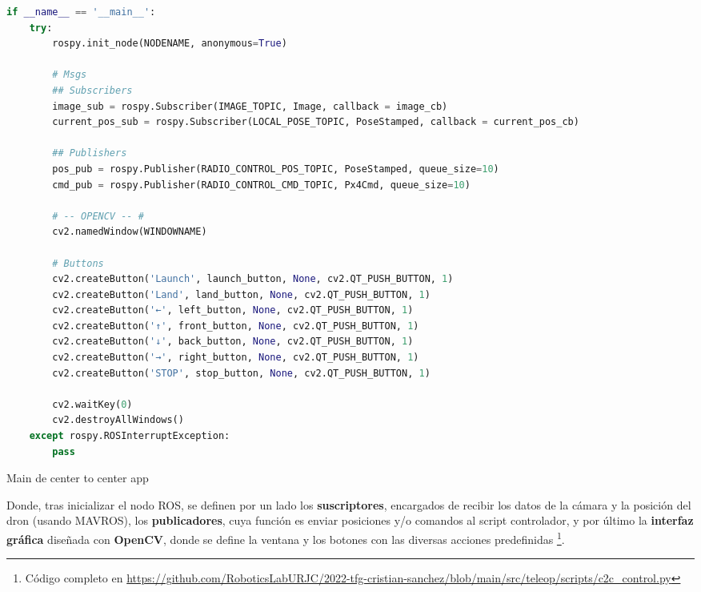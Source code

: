 \begin{code}[H]
\begin{lstlisting}[language=Python]
if __name__ == '__main__':
    try:
        rospy.init_node(NODENAME, anonymous=True)

        # Msgs
        ## Subscribers
        image_sub = rospy.Subscriber(IMAGE_TOPIC, Image, callback = image_cb)
        current_pos_sub = rospy.Subscriber(LOCAL_POSE_TOPIC, PoseStamped, callback = current_pos_cb)

        ## Publishers
        pos_pub = rospy.Publisher(RADIO_CONTROL_POS_TOPIC, PoseStamped, queue_size=10)
        cmd_pub = rospy.Publisher(RADIO_CONTROL_CMD_TOPIC, Px4Cmd, queue_size=10)

        # -- OPENCV -- #
        cv2.namedWindow(WINDOWNAME)

        # Buttons
        cv2.createButton('Launch', launch_button, None, cv2.QT_PUSH_BUTTON, 1)
        cv2.createButton('Land', land_button, None, cv2.QT_PUSH_BUTTON, 1)
        cv2.createButton('←', left_button, None, cv2.QT_PUSH_BUTTON, 1)
        cv2.createButton('↑', front_button, None, cv2.QT_PUSH_BUTTON, 1)
        cv2.createButton('↓', back_button, None, cv2.QT_PUSH_BUTTON, 1)
        cv2.createButton('→', right_button, None, cv2.QT_PUSH_BUTTON, 1)
        cv2.createButton('STOP', stop_button, None, cv2.QT_PUSH_BUTTON, 1)

        cv2.waitKey(0)
        cv2.destroyAllWindows()
    except rospy.ROSInterruptException:
        pass
\end{lstlisting}
\caption[Main de center to center app]{Main de center to center app}
\label{cod:c2c_app}
\end{code}

Donde, tras inicializar el nodo \ac{ROS}, se definen por un lado los \textbf{suscriptores}, encargados de recibir los datos de la cámara y la posición del dron (usando MAVROS), los \textbf{publicadores}, cuya función es enviar posiciones y/o comandos al script controlador, y por último la \textbf{interfaz gráfica} diseñada con \textbf{OpenCV}, donde se define la ventana y los botones con las diversas acciones predefinidas \footnote{Código completo en \url{https://github.com/RoboticsLabURJC/2022-tfg-cristian-sanchez/blob/main/src/teleop/scripts/c2c_control.py}}.\\